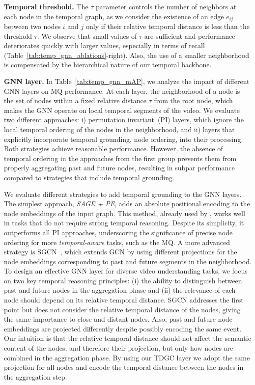 \smallskip
\smallskip
\noindent\textbf{Temporal threshold.} The $\tau$ parameter controls the number of neighbors at each node in the temporal graph, as we consider the existence of an edge  $e_{ij}$ between two nodes $i$ and $j$ only if their relative temporal distance is less than the threshold $\tau$.
We observe that small values of $\tau$ are sufficient and performance deteriorates quickly with larger values, especially in terms of recall (Table~\ref{tab:temp_gnn_ablations}-right).
Also, the use of a smaller neighborhood is compensated by the hierarchical nature of our temporal backbone.

\smallskip
\smallskip
\noindent\textbf{GNN layer.}
In Table~\ref{tab:temp_gnn_mAP}, we analyze the impact of different GNN layers on MQ performance.
At each layer, the neighborhood of a node is the set of nodes within a fixed relative distance $\tau$ from the root node, which makes the GNN operate on local temporal segments of the video.
We evaluate two different approaches: i) permutation invariant~(PI) layers, which ignore the local temporal ordering of the nodes in the neighborhood, and ii) layers that explicitly incorporate temporal grounding, \ie node ordering, into their processing.
Both strategies achieve reasonable performance.
However, the absence of temporal ordering in the approaches from the first group prevents them from properly aggregating past and future nodes, resulting in subpar performance compared to strategies that include temporal grounding.

We evaluate different strategies to add temporal grounding to the GNN layers.
The simplest approach, \emph{SAGE + PE}, adds an absolute positional encoding to the node embeddings of the input graph.
This method, already used by \ourscvpr, works well in tasks that do not require strong temporal reasoning. Despite its simplicity, it outperforms all PI approaches, underscoring the significance of precise node ordering for more \textit{temporal-aware} tasks, such as the MQ.
A more advanced strategy is SGCN~\cite{8594922}, which extends GCN by using different projections for the node embeddings corresponding to past and future segments in the neighborhood.
To design an effective GNN layer for diverse video understanding tasks, we focus on two key temporal reasoning principles: (i) the ability to distinguish between past and future nodes in the aggregation phase and (ii) the relevance of each node should depend on its relative temporal distance.
SGCN addresses the first point but does not consider the relative temporal distance of the nodes, giving the same importance to close and distant nodes. Also, past and future node embeddings are projected differently despite possibly encoding the same event.
Our intuition is that the relative temporal distance should not affect the semantic content of the nodes, and therefore their projection, but only how nodes are combined in the aggregation phase.
By using our TDGC layer we adopt the same projection for all nodes and encode the temporal distance between the nodes in the aggregation step.


